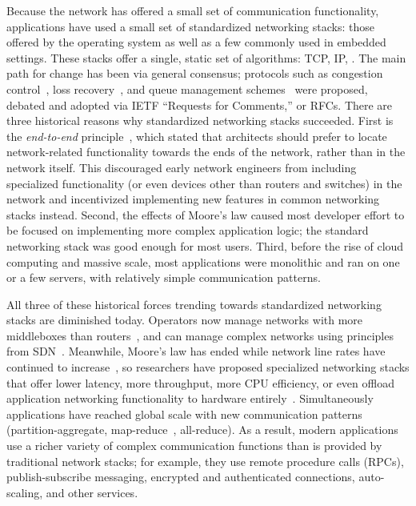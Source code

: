 \documentclass[fontsize=12pt,paper=letter]{scrartcl}
\begin{document}
Because the network has offered a small set of communication functionality, applications have used a small set of standardized networking stacks: those offered by the operating system as well as a few commonly used in embedded settings. 
These stacks offer a single, static set of algorithms: TCP, IP, \etc. 
The main path for change has been via general consensus; \eg protocols such as congestion control~\cite{Jacobson88, westwood, bbr, vegas, hybla}, loss recovery~\cite{fast-recovery-rfc, sack, prr}, and queue management schemes~\cite{red, blue-aqm, avq, pie, CoDel, fq} were proposed, debated and adopted via IETF ``Requests for Comments,'' or RFCs.
There are three historical reasons why standardized networking stacks succeeded.
First is the \emph{end-to-end} principle~\cite{e2e}, which stated that architects should prefer to locate network-related functionality towards the ends of the network, rather than in the network itself.
This discouraged early network engineers from including specialized functionality (or even devices other than routers and switches) in the network and incentivized implementing new features in common networking stacks instead.
Second, the effects of Moore's law caused most developer effort to be focused on implementing more complex application logic; the standard networking stack was good enough for most users.
Third, before the rise of cloud computing and massive scale, most applications were monolithic and ran on one or a few servers, with relatively simple communication patterns. 

All three of these historical forces trending towards standardized networking stacks are diminished today. 
Operators now manage networks with more middleboxes than routers~\cite{aplomb}, and can manage complex networks using principles from SDN~\cite{ethane, openflow}. 
Meanwhile, Moore's law has ended while network line rates have continued to increase~\cite{isca-moore}, so researchers have proposed specialized networking stacks that offer lower latency, more throughput, more CPU efficiency, or even offload application networking functionality to hardware entirely~\cite{netmap, ix, arrakis, zygos, mtcp, shenango, farm, erpc, tonic}.
Simultaneously applications have reached global scale with new communication patterns (partition-aggregate, map-reduce~\cite{mapreduce}, all-reduce).
As a result, modern applications use a richer variety of complex communication functions than is provided by traditional network stacks; for example, they use remote procedure calls (RPCs), publish-subscribe messaging, encrypted and authenticated connections, auto-scaling, and other services. 
\end{document}
